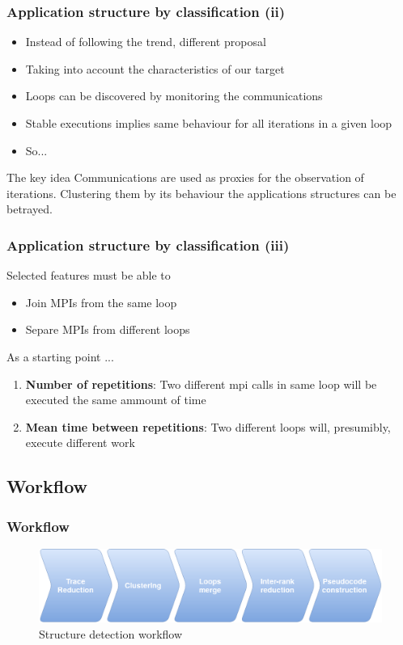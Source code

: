 \documentclass{beamer}
\begin{document}
\begin{frame}
\frametitle{Application structure by classification (ii)}
\begin{itemize}
	\item Instead of following the trend, different proposal
	\item Taking into account the characteristics of our target
	\item Loops can be discovered by monitoring the communications
	\item Stable executions implies same behaviour for all iterations in a given loop
	\item So...
\end{itemize}
\vfill
\pause
\begin{block}{The key idea}
	Communications are used as proxies for the observation of iterations. Clustering them by its behaviour the applications structures can be betrayed.
\end{block}
\end{frame}

\begin{frame}
\frametitle{Application structure by classification (iii)}
Selected features must be able to
\begin{itemize}
	\item Join MPIs from the same loop
	\item Separe MPIs from different loops
\end{itemize}
\vfill
\pause
As a starting point ...
\begin{enumerate}
	\item \textbf{Number of repetitions}: Two different mpi calls in same loop will be executed the same ammount of time
	\item \textbf{Mean time between repetitions}: Two different loops will, presumibly, execute different work
\end{enumerate}
\end{frame}

\subsection{Workflow}
\begin{frame}
\frametitle{Workflow}
\begin{figure}
	\includegraphics[width=\textwidth]{imgs/workflow.png}
	\caption{Structure detection workflow}
\end{figure}
\end{frame}
\end{document}
